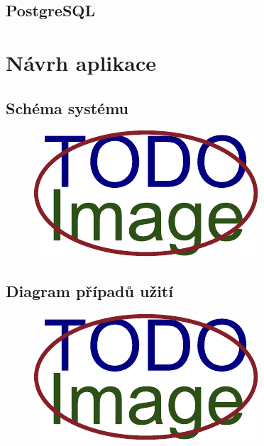\blindtext

\section{PostgreSQL}
\blindtext

\chapter{Návrh aplikace}
\blindtext

\section{Schéma systému}
\blindtext
\begin{figure}[H]
	\centering
	\includegraphics[width=\textwidth]{obrazky-figures/placeholder.pdf}
\end{figure}

\section{Diagram případů užití}
\blindtext
\begin{figure}[H]
	\centering
	\includegraphics[width=\textwidth]{obrazky-figures/placeholder.pdf}
\end{figure}

